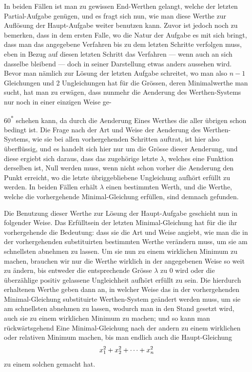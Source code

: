 \indent In beiden Fällen ist man zu gewissen End-Werthen gelangt, welche der letzten Partial-Aufgabe genügen, und es fragt sich nun, wie man diese Werthe zur Auflösung der Haupt-Aufgabe weiter benutzen kann. Zuvor ist jedoch noch zu bemerken, dass in dem ersten Falle, wo die Natur der Aufgabe es mit sich bringt, dass man das angegebene Verfahren bis zu dem letzten Schritte verfolgen muss, eben in Bezug auf diesen letzten Schritt das Verfahren — wenn auch an sich dasselbe bleibend — doch in seiner Darstellung etwas anders aussehen wird. Bevor man nämlich zur Lösung der letzten Aufgabe schreitet, wo man also \(n-1\) Gleichungen und 2 Ungleichungen hat für die Grössen, deren Minimalwerthe man sucht, hat man zu erwägen, dass nunmehr die Aenderung des Werthen-Systems nur noch in einer einzigen Weise ge-
\par\vfill\noindent\hfill60\textsuperscript{*}
\clearpage{}
\noindent schehen kann, da durch die Aenderung Eines Werthes die aller übrigen schon bedingt ist. Die Frage nach der Art und Weise der Aenderung des Werthen-Systems, wie sie bei allen vorhergehenden Schritten auftrat, ist hier also überflüssig, und es handelt sich hier nur um die Grösse dieser Aenderung, und diese ergiebt sich daraus, dass das zugehörige letzte \(\lambda\), welches eine Funktion derselben ist, Null werden muss, wenn nicht schon vorher die Aenderung den Punkt erreicht, wo die letzte übriggebliebene Ungleichung aufhört erfüllt zu werden. In beiden Fällen erhält \(\lambda\) einen bestimmten Werth, und die Werthe, welche die vorhergehende Minimal-Gleichung erfüllen, sind demnach gefunden.

\indent Die Benutzung dieser Werthe zur Lösung der Haupt-Aufgabe geschieht nun in folgender Weise. Das Erfülltsein der letzten Minimal-Gleichung hat für die ihr vorhergehende die Bedeutung: dass sie die Art und Weise angiebt, wie man die in der vorhergehenden substituirten bestimmten Werthe verändern muss, um sie am schnellsten abnehmen zu lassen. Um sie nun zu einem wirklichen Minimum zu machen, brauchen wir nur die Werthe wirklich in der angegebenen Weise so weit zu ändern, bis entweder die entsprechende Grösse \(\lambda\) zu 0 wird oder die überzählige positiv gelassene Ungleichheit aufhört erfüllt zu sein. Die hierdurch erhaltenen Werthe geben dann an, in welcher Weise das in der vorhergehenden Minimal-Gleichung substituirte Werthen-System geändert werden muss, um sie am schnellsten abnehmen zu lassen, wodurch man in den Stand gesetzt wird, auch sie zu einem wirklichen Minimum zu machen; und so kann man rückwärtsgehend Eine Minimal-Gleichung nach der andern zu einem wirklichen oder relativen Minimum machen, bis man endlich auch die Haupt-Gleichung
\[
x_1^2+x_2^2+\mathinner{\cdotp\cdotp\cdotp}+x_n^2
\]
\noindent zu einem solchen gemacht hat.

